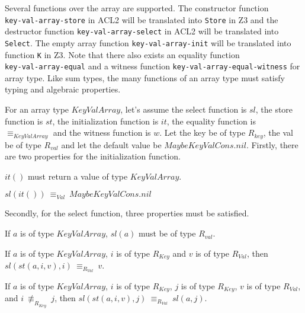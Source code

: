 Several functions over the array are supported. The constructor function \\
\texttt{key-val-array-store} in ACL2 will be translated into \texttt{Store} in
Z3 and the destructor function \texttt{key-val-array-select} in ACL2 will be
translated into \texttt{Select}.
The empty array function \texttt{key-val-array-init} will be translated into
function \texttt{K} in Z3.
Note that there also exists an equality function \\
\texttt{key-val-array-equal} and a witness function
\texttt{key-val-array-equal-witness} for array type. Like sum types, the many
functions of an array type must satisfy typing and algebraic properties.

For an array type $KeyValArray$, let's assume the select function is
$sl$, the store function is $st$, the initialization function
is $it$, the equality function is $\equiv_{KeyValArray}$ and the witness function
is $w$. Let the key be of type $R_{key}$, the val be of type $R_{val}$ and let
the default value be $MaybeKeyValCons.nil$.
Firstly, there are two properties for the initialization function.
\begin{property}
  $it()$ must return a value of type $KeyValArray$.
\end{property}

\begin{property}
  $sl(it())\: \equiv_{Val}\: MaybeKeyValCons.nil$
\end{property}

\noindent Secondly, for the select function, three properties must be satisfied.
\begin{property}
  If $a$ is of type $KeyValArray$, $sl(a)$ must be of type $R_{val}$.
\end{property}

\begin{property}
  If $a$ is of type $KeyValArray$, $i$ is of type $R_{Key}$ and $v$ is of type
  $R_{Val}$, then $sl(st(a, i, v), i)\: \equiv_{R_{Val}}\: v$.
\end{property}

\begin{property}
  If $a$ is of type $KeyValArray$, $i$ is of type $R_{Key}$, $j$ is of type
  $R_{Key}$, $v$ is of type $R_{Val}$, and $i\: \not\equiv_{R_{Key}}\: j$, then
  $sl(st(a, i, v), j)\: \equiv_{R_{Val}}\: sl(a, j)$.
\end{property}

